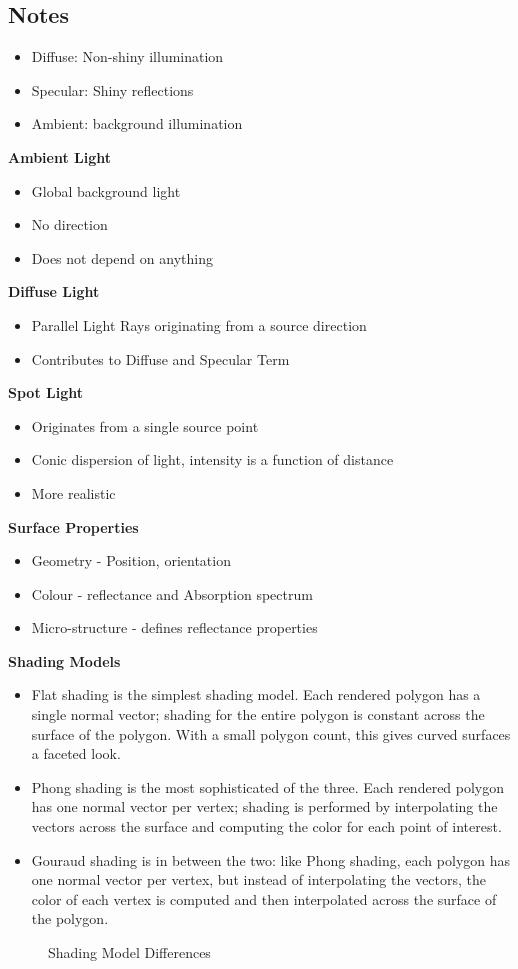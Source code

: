 \subsection{Notes}
\begin{itemize}
	\item Diffuse: Non-shiny illumination
	\item Specular: Shiny reflections
	\item Ambient: background illumination
\end{itemize}
\textbf{Ambient Light}
\begin{itemize}
	\item Global background light
	\item No direction
	\item Does not depend on anything
\end{itemize}
\textbf{Diffuse Light}
\begin{itemize}
	\item Parallel Light Rays originating from a source direction
	\item Contributes to Diffuse and Specular Term
\end{itemize}
\textbf{Spot Light}
\begin{itemize}
	\item Originates from a single source point
	\item Conic dispersion of light, intensity is a function of distance
	\item More realistic
\end{itemize}
\textbf{Surface Properties}
\begin{itemize}
	\item Geometry - Position, orientation
	\item Colour - reflectance and Absorption spectrum
	\item Micro-structure - defines reflectance properties
\end{itemize}
\textbf{Shading Models}
\begin{itemize}
	\item	Flat shading is the simplest shading model. Each rendered polygon has a single normal vector; shading for the entire polygon is constant across the surface of the polygon. With a small polygon count, this gives curved surfaces a faceted look.
	
	\item	Phong shading is the most sophisticated of the three. Each rendered polygon has one normal vector per vertex; shading is performed by interpolating the vectors across the surface and computing the color for each point of interest.
	
	\item	Gouraud shading is in between the two: like Phong shading, each polygon has one normal vector per vertex, but instead of interpolating the vectors, the color of each vertex is computed and then interpolated across the surface of the polygon.
\end{itemize}
  \begin{figure}[!htb]
	\caption{\label{fig:normalCube} Shading Model Differences}
\end{figure}
